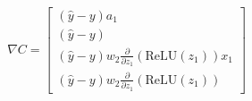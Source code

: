 \documentclass[preview]{standalone}
\begin{document}
\begin{align*}
\nabla C = \begin{bmatrix} (\hat{y} - y) a_1 \\ (\hat{y} - y) \\ (\hat{y} - y) w_2 \frac{\partial}{\partial z_1}(\text{ReLU}(z_1)) x_1 \\ (\hat{y} - y) w_2 \frac{\partial}{\partial z_1}(\text{ReLU}(z_1)) \end{bmatrix}
\end{align*}
\end{document}
